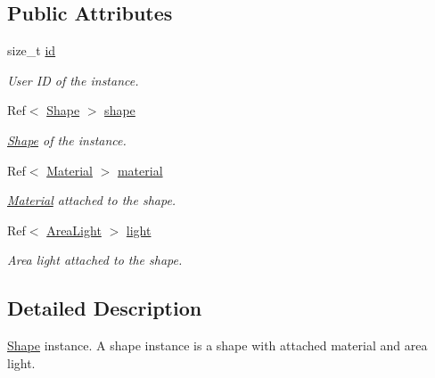 \subsection*{Public Attributes}
\begin{DoxyCompactItemize}
\item 
size\_\-t \hyperlink{classembree_1_1_instance_ab9ba19e8d4aff6c227a838c32f6b8177}{id}
\begin{DoxyCompactList}\small\item\em User ID of the instance. \item\end{DoxyCompactList}\item 
Ref$<$ \hyperlink{classembree_1_1_shape}{Shape} $>$ \hyperlink{classembree_1_1_instance_aa9909b2b3ee187625a4369ca6b95d5d1}{shape}
\begin{DoxyCompactList}\small\item\em \hyperlink{classembree_1_1_shape}{Shape} of the instance. \item\end{DoxyCompactList}\item 
Ref$<$ \hyperlink{classembree_1_1_material}{Material} $>$ \hyperlink{classembree_1_1_instance_ad5fe641abd632683f5d19fbc6147451d}{material}
\begin{DoxyCompactList}\small\item\em \hyperlink{classembree_1_1_material}{Material} attached to the shape. \item\end{DoxyCompactList}\item 
Ref$<$ \hyperlink{classembree_1_1_area_light}{AreaLight} $>$ \hyperlink{classembree_1_1_instance_a49f4f82835231478a9e524a025e35461}{light}
\begin{DoxyCompactList}\small\item\em Area light attached to the shape. \item\end{DoxyCompactList}\end{DoxyCompactItemize}


\subsection{Detailed Description}
\hyperlink{classembree_1_1_shape}{Shape} instance. A shape instance is a shape with attached material and area light. 

